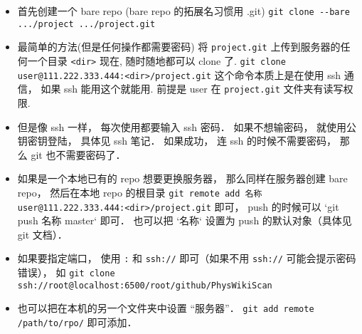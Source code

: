 
\begin{issues}
\issueDraft
\end{issues}


\begin{itemize}
\item 首先创建一个 bare repo (bare repo 的拓展名习惯用 .git)
\verb|git clone --bare .../project .../project.git|

\item 最简单的方法(但是任何操作都需要密码)
将 \verb|project.git| 上传到服务器的任何一个目录 \verb|<dir>|
现在, 随时随地都可以 clone 了.
\verb`git clone user@111.222.333.444:<dir>/project.git`
这个命令本质上是在使用 ssh 通信， 如果 ssh 能用这个就能用.
前提是 user 在 \verb|project.git| 文件夹有读写权限.

\item 但是像 ssh 一样， 每次使用都要输入 ssh 密码． 如果不想输密码， 就使用公钥密钥登陆， 具体见 ssh 笔记． 如果成功， 连 ssh 的时候不需要密码， 那么 git 也不需要密码了．

\item 如果是一个本地已有的 repo 想要更换服务器， 那么同样在服务器创建 bare repo， 然后在本地 repo 的根目录 \verb`git remote add 名称 user@111.222.333.444:<dir>/project.git` 即可， push 的时候可以 `git push 名称 master` 即可． 也可以把 `名称` 设置为 push 的默认对象（具体见 git 文档）．

\item 如果要指定端口， 使用 \verb`:` 和 \verb`ssh://` 即可（如果不用 \verb`ssh://` 可能会提示密码错误）， 如 \verb`git clone ssh://root@localhost:6500/root/github/PhysWikiScan`

\item 也可以把在本机的另一个文件夹中设置 “服务器”． \verb|git add remote /path/to/rpo/| 即可添加．
\end{itemize}
